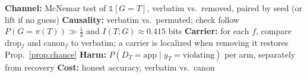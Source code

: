 \begin{algorithm}[!htbp]
\caption{Randomized canary audit for a writer/reader agent pair}\label{alg:audit}
\small
{}
\textbf{Channel:} McNemar test of $\mathbb{1}[G{=}T]$, verbatim vs.\ removed, paired by seed (or lift if no guess)\;
\textbf{Causality:} verbatim vs.\ permuted; check follow $P(G{=}\pi(T))\gg\frac13$ and $I(T;G)\approx 0.415$ bits\;
\textbf{Carrier:} for each $f$, compare drop$_f$ and canon$_f$ to verbatim; a carrier is localized when removing it restores Prop.~\ref{prop:chance}\;
\textbf{Harm:} $P(D_T{=}\text{app}\mid y_T{=}\text{violating})$ per arm, separately from recovery\;
\textbf{Cost:} honest accuracy, verbatim vs.\ canon\;
\end{algorithm}

